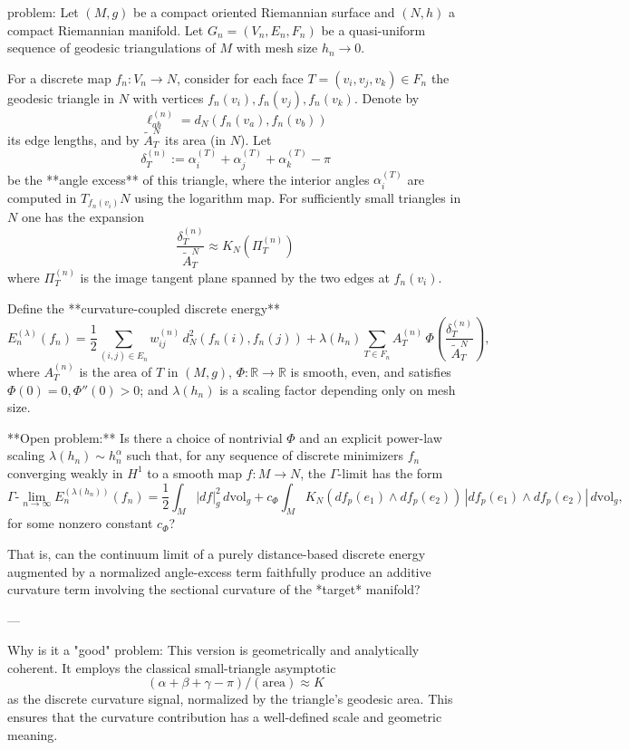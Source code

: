problem:  
Let \( (M,g) \) be a compact oriented Riemannian surface and \( (N,h) \) a compact Riemannian manifold.  
Let \(G_n=(V_n,E_n,F_n)\) be a quasi-uniform sequence of geodesic triangulations of \(M\) with mesh size \(h_n\to0\).  

For a discrete map \(f_n:V_n\to N\), consider for each face \(T=(v_i,v_j,v_k)\in F_n\) the geodesic triangle in \(N\) with vertices \(f_n(v_i),f_n(v_j),f_n(v_k)\). Denote by  
\[
\ell_{ab}^{(n)} = d_N(f_n(v_a),f_n(v_b))
\]
its edge lengths, and by \(\tilde{A}_T^N\) its area (in \(N\)). Let
\[
\delta_T^{(n)} := \alpha_i^{(T)}+\alpha_j^{(T)}+\alpha_k^{(T)}-\pi
\]
be the **angle excess** of this triangle, where the interior angles \(\alpha_i^{(T)}\) are computed in \(T_{f_n(v_i)}N\) using the logarithm map.  
For sufficiently small triangles in \(N\) one has the expansion
\[
\frac{\delta_T^{(n)}}{\tilde{A}_T^N}\approx K_N(\Pi_T^{(n)})
\]
where \(\Pi_T^{(n)}\) is the image tangent plane spanned by the two edges at \(f_n(v_i)\).

Define the **curvature-coupled discrete energy**
\[
E_n^{(\lambda)}(f_n)
=\frac12\sum_{(i,j)\in E_n} w_{ij}^{(n)}\, d_N^2(f_n(i),f_n(j))
+\lambda(h_n)\sum_{T\in F_n} A_T^{(n)}\, \Phi\!\left(\frac{\delta_T^{(n)}}{\tilde{A}_T^N}\right),
\]
where \(A_T^{(n)}\) is the area of \(T\) in \((M,g)\),  
\(\Phi:\mathbb{R}\to\mathbb{R}\) is smooth, even, and satisfies \(\Phi(0)=0,\Phi''(0)>0\); and \(\lambda(h_n)\) is a scaling factor depending only on mesh size.

**Open problem:**  
Is there a choice of nontrivial \(\Phi\) and an explicit power-law scaling \(\lambda(h_n)\sim h_n^{\alpha}\) such that, for any sequence of discrete minimizers \(f_n\) converging weakly in \(H^1\) to a smooth map \(f:M\to N\), the $\Gamma$-limit has the form  
\[
\Gamma\text{-}\lim_{n\to\infty} E_n^{(\lambda(h_n))}(f_n)
=\frac{1}{2}\int_M |df|_g^2\,d\mathrm{vol}_g
+c_\Phi\int_MK_N(df_p(e_1)\wedge df_p(e_2))\,|\!df_p(e_1)\wedge df_p(e_2)\!|\,d\mathrm{vol}_g,
\]
for some nonzero constant \(c_\Phi\)?  

That is, can the continuum limit of a purely distance-based discrete energy augmented by a normalized angle-excess term faithfully produce an additive curvature term involving the sectional curvature of the *target* manifold?

---

Why is it a "good" problem:  
This version is geometrically and analytically coherent. It employs the classical small-triangle asymptotic  
\[
(\alpha+\beta+\gamma-\pi)/(\text{area}) \approx K
\]
as the discrete curvature signal, normalized by the triangle’s geodesic area. This ensures that the curvature contribution has a well-defined scale and geometric meaning.  

